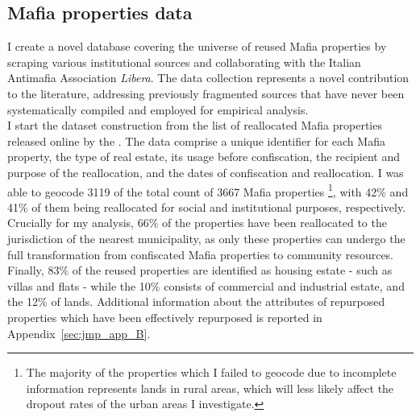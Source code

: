 \documentclass[12pt]{article}
\theoremstyle{plain}
\theoremstyle{plain}
\theoremstyle{plain}
\theoremstyle{definition}
\theoremstyle{plain}
\theoremstyle{definition}
\theoremstyle{plain}
\theoremstyle{remark}
\theoremstyle{definition}
\theoremstyle{definition}
\theoremstyle{plain}
\begin{document}
\subsection{Mafia properties data}
\label{sec:jmp_mafia_data}
I create a novel database covering the universe of reused Mafia properties by scraping various institutional sources and collaborating with the Italian Antimafia Association \emph{Libera}. The data collection represents a novel contribution to the literature, addressing previously fragmented sources that have never been systematically compiled and employed for empirical analysis. \\
I start the dataset construction from the list of reallocated Mafia properties released online by the \citet{anbsc_beni_2023}. The data comprise a unique identifier for each Mafia property, the type of real estate, its usage before confiscation, the recipient and purpose of the reallocation, and the dates of confiscation and reallocation. 
I was able to geocode 3119 of the total count of 3667 Mafia properties \footnote{The majority of the properties which I failed to geocode due to incomplete information represents lands in rural areas, which will less likely affect the dropout rates of the urban areas I investigate.}, with 42\% and 41\% of them being reallocated for social and institutional purposes, respectively. Crucially for my analysis, 66\% of the properties have been reallocated to the jurisdiction of the nearest municipality, as only these properties can undergo the full transformation from confiscated Mafia properties to community resources. Finally, 83\% of the reused properties are identified as housing estate - such as villas and flats - while the 10\% consists of commercial and industrial estate, and the 12\% of lands. Additional information about the attributes of repurposed properties which have been effectively repurposed is reported in Appendix~\ref{sec:jmp_app_B}. \par
\end{document}

